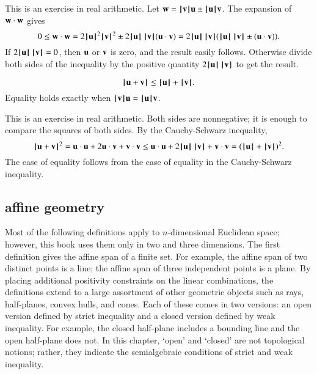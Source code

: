 \begin{proved}
This is an exercise in real arithmetic.
   Let $\w = \normo{\v} \u \pm \normo{\u} \v$.  The expansion of $\w\cdot \w$ gives
    \begin{displaymath}0\le \w\cdot \w = 2\normo{\u}^2\normo{\v}^2 \pm 2\normo{\u}\, \normo{\v} (\u\cdot \v) =
    2\normo{\u}\,
    \normo{\v} (\normo{\u}\, \normo{\v} \pm (\u \cdot \v)).\end{displaymath}
    If $2\normo{\u} \,\normo{\v} = 0$, then $\u$ or $\v$ is zero, and the result
    easily follows.  Otherwise divide both sides of the inequality
    by the positive quantity $2 \normo{\u} \,\normo{\v}$ to get the result.
\swallowed\end{proved}

\begin{lemma}\label{lemma:triangle}
  \begin{displaymath}
  \normo{\u + \v} \le \normo{\u} + \normo{\v }.
  \end{displaymath}
Equality holds exactly when $\normo{\v}\u = \normo{\u}\v$.
\end{lemma}
%

\begin{proved}  This is an exercise in real arithmetic.
Both sides are nonnegative; it is enough to compare the squares of
both sides.  By the Cauchy-Schwarz inequality,
    \begin{displaymath}\normo{\u + \v}^2 = \u\cdot \u + 2 \u\cdot \v + \v\cdot \v \le
      \u\cdot \u + 2 \normo{ \u}\,\normo{\v} + \v\cdot \v = (\normo{\u}+\normo{\v})^2.
    \end{displaymath}
The case of equality follows from the case of equality in the
Cauchy-Schwarz inequality.
\swallowed\end{proved}



\subsection{affine geometry}




\begin{summary}Most of the following definitions apply to $n$-dimensional
Euclidean space; however, this book uses them only in
two and three dimensions.  The first definition 
gives the affine span of a finite set.  For example,
the affine span of two distinct points is a line;
the affine span of three independent points is a plane.
By placing additional
positivity constraints on the linear combinations, the definitions
extend to a large assortment of other geometric objects
such as rays, half-planes, convex hulls, and cones.  
Each of these comes in two versions: an open version
defined by strict inequality and a closed version defined
by weak inequality.  For example, the closed half-plane
includes a bounding line and the open half-plane does
not.  In this chapter, `open' and `closed' are not topological notions; rather, they
indicate the semialgebraic conditions of strict  and weak inequality.
\end{summary}


